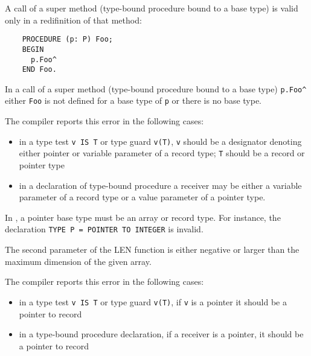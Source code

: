 
A call of a super method (type-bound procedure bound to a base type)
is valid only in a redifinition of that method:

\begin{verbatim}
    PROCEDURE (p: P) Foo;
    BEGIN
      p.Foo^
    END Foo.
\end{verbatim}


In a call of a super method (type-bound procedure bound to a base type)
\verb'p.Foo^' either \verb'Foo' is not defined for a base type of
\verb'p' or there is no base type.


The \ot{} compiler reports this error in the following cases:
\begin{itemize}
\item in a type test \verb'v IS T' or type guard \verb'v(T)', \verb'v'
      should be a designator denoting either pointer or
      variable parameter of a record type;
      \verb'T' should be a record or pointer type
\item in a declaration of type-bound procedure a receiver may be either a
      variable parameter of a record type or a value parameter of a pointer
      type.
\end{itemize}


In \ot{}, a pointer base type must be an array or record type.
For instance, the declaration \verb'TYPE P = POINTER TO INTEGER' is invalid.


The second parameter of the LEN function is either negative or
larger than the maximum dimension of the given array.


The \ot{} compiler reports this error in the following cases:
\begin{itemize}
\item in a type test \verb'v IS T' or type guard \verb'v(T)',
      if \verb'v' is a pointer it should be a pointer to record
\item in a type-bound procedure declaration, if a receiver is
      a pointer, it should be a pointer to record
\end{itemize}


